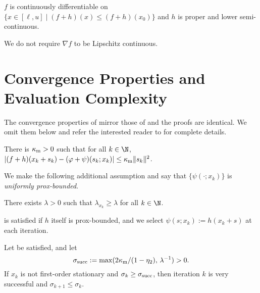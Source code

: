 \documentclass[smallextended]{svjour3}       %
\begin{document}
\begin{problemassumption}%
  \label{asm:g-lipschitz}
  \(f\) is continuously differentiable on \(\{x \in [\ell, u] \mid (f+h)(x) \leq (f+h)(x_0)\}\) and \(h\) is proper and lower semi-continuous.
\end{problemassumption}

\begin{remark}
  We do not require \(\nabla f\) to be Lipschitz continuous.
\end{remark}

\section{Convergence Properties and Evaluation Complexity}%
\label{sec:convergence}

The convergence properties of  mirror those of \citep[Algorithm~\(4.1\)]{aravkin-baraldi-orban-2022b} and the proofs are identical.
We omit them below and refer the interested reader to \citep{aravkin-baraldi-orban-2022b} for complete details.

\begin{modelassumption}%
  \label{asm:model-adequacy}
  There is \(\kappa_{\textup{m}} > 0\) such that for all \(k \in \N\), \(|(f + h)(x_k + s_k) - (\varphi +
\psi)(s_k; x_k)| \leq \kappa_{\textup{m}} \|s_k\|^2\).
\end{modelassumption}

We make the following additional assumption and say that \(\{\psi(\cdot; x_k)\}\) is \emph{uniformly prox-bounded}.

\begin{modelassumption}%
  \label{asm:unif-prox-bounded}
  There exists \(\lambda > 0\) such that \(\lambda_{x_k} \geq \lambda\) for all \(k \in \N\).
\end{modelassumption}

 is satisfied if \(h\) itself is prox-bounded, and we select \(\psi(s; x_k) := h(x_k + s)\) at each iteration.

\begin{theorem}%
  \label{thm:sigmasucc}
  Let  be satisfied, and let
  \begin{equation}
    \label{eq:def-sigmasucc}
    \sigma_{\textup{succ}} :=
    \max(2 \kappa_{\textup{m}} / (1 - \eta_2), \, \lambda^{-1})
     > 0.
  \end{equation}
  If \(x_k\) is not first-order stationary and
  \(
    \sigma_k \geq \sigma_{\textup{succ}}
  \),
  then iteration \(k\) is very successful and
  \(
    \sigma_{k+1} \leq \sigma_k
  \).
\end{theorem}
\end{document}
